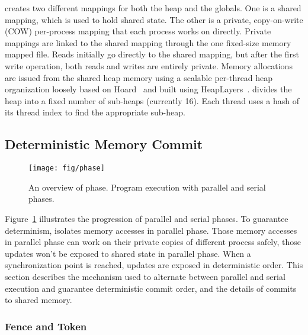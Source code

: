 \dthreads{} creates two different mappings for both the heap and the
globals.  One is a shared mapping, which is used to hold shared state.
The other is a private, copy-on-write (COW) per-process mapping that
each process works on directly.  Private mappings are linked to the
shared mapping through the one fixed-size memory mapped file.
Reads initially go directly to the shared mapping,
but after the first write operation,
both reads and writes are entirely private.
Memory allocations are issued from the shared heap memory using a scalable per-thread heap organization loosely based on Hoard~\cite{BergerMcKinleyBlumofeWilson:ASPLOS2000} and built using HeapLayers~\cite{BergeZornMcKinley:2001}.  \dthreads{} divides the heap into a fixed number of sub-heaps (currently 16).  Each thread uses a hash of its thread index to find the appropriate sub-heap.

\subsection{Deterministic Memory Commit}
\label{sec:sharedmem}

\begin{figure}
{\centering 
\texttt{[image: fig/phase]}
\caption{An overview of \dthreads{} phase. Program execution with \dthreads{} parallel and serial phases.\label{fig:phase}}
}
\end{figure}

Figure~\ref{fig:phase} illustrates the progression of parallel and serial phases. 
To guarantee determinism, \dthreads{} isolates memory accesses in parallel phase. Those memory accesses in
parallel phase can work on their private copies of different process safely, those updates won't be exposed to 
shared state in parallel phase.
When a synchronization point is reached, updates are exposed in deterministic order.  
This section describes the mechanism used to alternate between parallel and serial execution 
and guarantee deterministic commit order, and the details of commits to shared memory.

\subsubsection{Fence and Token}
\label{sec:schedule}

